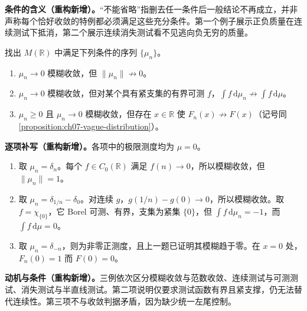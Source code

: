 \documentclass[../../main.tex]{subfiles}
\begin{document}
\begin{remark}
\textbf{条件的含义（重构新增）。}“不能省略”指删去任一条件后一般结论不再成立，并非声称每个恰好收敛的特例都必须满足这些充分条件。第一个例子展示正负质量在连续测试下抵消，第二个展示连续消失测试看不见逃向负无穷的质量。
\end{remark}
\begin{exercise}\label{exercise:ch07-vague-counterexamples}
找出 $M(\mathbb R)$ 中满足下列条件的序列 $\{\mu_n\}$。
\begin{enumerate}
\item\label{item:ch07-vague-not-norm} $\mu_n\to0$ 模糊收敛，但 $\|\mu_n\|\not\to0$。
\item\label{item:ch07-vague-not-measurable-test} $\mu_n\to0$ 模糊收敛，但对某个具有紧支集的有界可测 $f$，$\int f\,\mathrm d\mu_n\not\to\int f\,\mathrm d\mu$。
\item\label{item:ch07-vague-not-distribution} $\mu_n\geqslant0$ 且 $\mu_n\to0$ 模糊收敛，但存在 $x\in\mathbb R$ 使 $F_n(x)\not\to F(x)$（记号同\cref{proposition:ch07-vague-distribution}）。
\end{enumerate}
\end{exercise}
\begin{solution}
\textbf{逐项补写（重构新增）。}各项中的极限测度均为 $\mu=0$。
\begin{enumerate}
\item 取 $\mu_n=\delta_n$。每个 $f\in C_0(\mathbb R)$ 满足 $f(n)\to0$，所以模糊收敛，但 $\|\mu_n\|=1$。
\item 取 $\mu_n=\delta_{1/n}-\delta_0$。对连续 $g$，$g(1/n)-g(0)\to0$，所以模糊收敛。取 $f=\chi_{\{0\}}$，它 Borel 可测、有界，支集为紧集 $\{0\}$，但 $\int f\,\mathrm d\mu_n=-1$，而 $\int f\,\mathrm d\mu=0$。
\item 取 $\mu_n=\delta_{-n}$，则为非零正测度，且上一题已证明其模糊趋于零。在 $x=0$ 处，$F_n(0)=1$ 而 $F(0)=0$。
\end{enumerate}
\end{solution}
\begin{remark}
\textbf{动机与条件（重构新增）。}三例依次区分模糊收敛与范数收敛、连续测试与可测测试、消失测试与半直线测试。第二项说明仅要求测试函数有界且紧支撑，仍无法替代连续性。第三项不与收敛判据矛盾，因为缺少统一左尾控制。
\end{remark}

\end{document}
